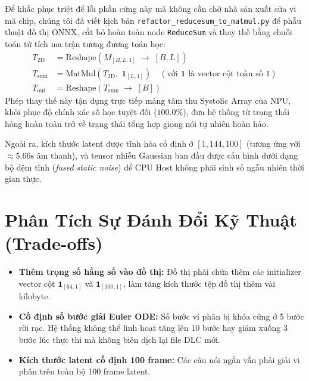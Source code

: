 \documentclass[11pt,a4paper,oneside,table]{report}
\begin{document}
Để khắc phục triệt để lỗi phần cứng này mà không cần chờ nhà sản xuất sửa vi mã chip, chúng tôi đã viết kịch bản \texttt{refactor\_reducesum\_to\_matmul.py} để phẫu thuật đồ thị ONNX, cắt bỏ hoàn toàn node \texttt{ReduceSum} và thay thế bằng chuỗi toán tử tích ma trận tương đương toán học:
\begin{align}
    T_{\text{2D}} &= \text{Reshape}\left(M_{[B, L, 1]} \;\to\; [B, L]\right) \\
    T_{\text{sum}} &= \text{MatMul}\left(T_{\text{2D}}, \; \mathbf{1}_{[L, 1]}\right) \quad (\text{với } \mathbf{1} \text{ là vector cột toàn số 1}) \\
    T_{\text{out}} &= \text{Reshape}\left(T_{\text{sum}} \;\to\; [B]\right)
\end{align}
Phép thay thế này tận dụng trực tiếp mảng tâm thu Systolic Array của NPU, khôi phục độ chính xác số học tuyệt đối ($100.0\%$), đưa hệ thống từ trạng thái hỏng hoàn toàn trở về trạng thái tổng hợp giọng nói tự nhiên hoàn hảo.

Ngoài ra, kích thước latent được tĩnh hóa cố định ở $[1, 144, 100]$ (tương ứng với $\approx 5.66\text{s}$ âm thanh), và tensor nhiễu Gaussian ban đầu được cấu hình dưới dạng bộ đệm tĩnh (\textit{fused static noise}) để CPU Host không phải sinh số ngẫu nhiên thời gian thực.

\section{Phân Tích Sự Đánh Đổi Kỹ Thuật (Trade-offs)}
\begin{itemize}
    \item \textbf{Thêm trọng số hằng số vào đồ thị:} Đồ thị phải chứa thêm các initializer vector cột $\mathbf{1}_{[64, 1]}$ và $\mathbf{1}_{[100, 1]}$, làm tăng kích thước tệp đồ thị thêm vài kilobyte.
    \item \textbf{Cố định số bước giải Euler ODE:} Số bước vi phân bị khóa cứng ở 5 bước rời rạc. Hệ thống không thể linh hoạt tăng lên 10 bước hay giảm xuống 3 bước lúc thực thi mà không biên dịch lại file DLC mới.
    \item \textbf{Kích thước latent cố định 100 frame:} Các câu nói ngắn vẫn phải giải vi phân trên toàn bộ 100 frame latent.
\end{itemize}
\end{document}
